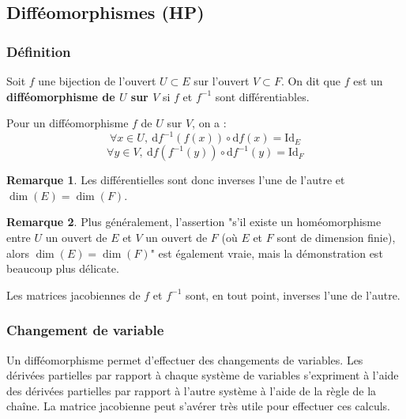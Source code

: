 \documentclass[french]{article}
\newcommand{\inv}{^{-1}}
\renewcommand{\d}{\text{d}}
\theoremstyle{plain}
\theoremstyle{definition}
\newtheorem*{rmq}{Remarque}
\theoremstyle{remark}
\begin{document}
\subsection{Difféomorphismes (HP)}

\subsubsection*{Définition}

\begin{dfn}
	Soit $f$ une bijection de l'ouvert $U\subset E$ sur l'ouvert $V\subset F$. On dit que $f$ est un \textbf{difféomorphisme de $U$ sur $V$} si $f$ et $f\inv$ sont différentiables.
\end{dfn}

\begin{prop}%
	Pour un difféomorphisme $f$ de $U$ sur $V$, on a :
	$$\forall x\in U,\ \d f\inv(f(x))\circ\d f(x)=\text{Id}_E$$
	$$\forall y\in V,\ \d f(f\inv(y))\circ\d f\inv(y)=\text{Id}_F$$
\end{prop}

\begin{rmq}
	Les différentielles sont donc inverses l'une de l'autre et $\dim(E)=\dim(F)$.
\end{rmq}

\begin{rmq}
	Plus généralement, l'assertion "s'il existe un homéomorphisme entre $U$ un ouvert de $E$ et $V$ un ouvert de $F$ (où $E$ et $F$ sont de dimension finie), alors $\dim(E)=\dim(F)$" est également vraie, mais la démonstration est beaucoup plus délicate.
\end{rmq}

\begin{cor}%
	Les matrices jacobiennes de $f$ et $f\inv$ sont, en tout point, inverses l'une de l'autre.
\end{cor}

\subsubsection*{Changement de variable}

Un difféomorphisme permet d'effectuer des changements de variables. Les dérivées partielles par rapport à chaque système de variables s'expriment à l'aide des dérivées partielles par rapport à l'autre système à l'aide de la règle de la chaîne. La matrice jacobienne peut s'avérer très utile pour effectuer ces calculs.
\end{document}
